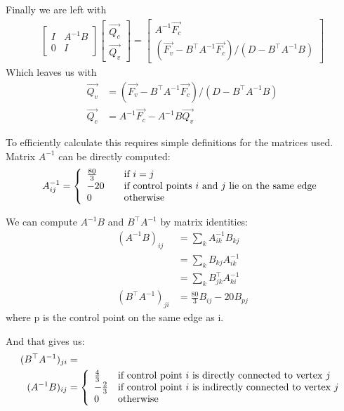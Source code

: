 \documentclass{article}
\begin{document}
Finally we are left with
\begin{align*}
\begin{bmatrix} 
I & A^{-1}B \\ 
0 & I
\end{bmatrix} 
\begin{bmatrix} 
\vec{Q_c} \\ 
\vec{Q_v}
\end{bmatrix}
=
\begin{bmatrix} 
A^{-1}\vec{F_c} \\ 
(\vec{F_v} - B^{\top}A^{-1}\vec{F_c})/(D - B^{\top}A^{-1}B)
\end{bmatrix}
\end{align*}
Which leaves us with
\begin{align*}
\vec{Q_v} &= (\vec{F_v} - B^{\top}A^{-1}\vec{F_c})/(D - B^{\top}A^{-1}B)\\
\vec{Q_c} &= A^{-1}\vec{F_c} - A^{-1}B \vec{Q_{v}}  
\end{align*}

To efficiently calculate this requires simple definitions for the matrices used.
Matrix $A^{-1}$ can be directly computed:
\begin{align*}
A^{-1}_{ij} = \left\{ 
  \begin{array}{l l}
    \frac{80}{3} & \quad \text{if $i=j$}\\
    -20 & \quad \text{if control points $i$ and $j$ lie on the same edge}\\
    0 & \quad \text{otherwise}\\
  \end{array} \right.
\end{align*}

We can compute $A^{-1}B$ and $B^{\top}A^{-1}$ by matrix identities:
\begin{align*}
(A^{-1}B)_{ij} &=  \sum_{k} A^{-1}_{ik} B_{kj} \\
&=  \sum_{k} B_{kj} A^{-1}_{ik} \\ 
&=  \sum_{k} B^{\top}_{jk} A^{-1}_{ki} \\ 
(B^{\top} A^{-1})_{ji} &=  \frac{80}{3} B_{ij} - 20 B_{pj}
\end{align*} 
where p is the control point on the same edge as i.

And that gives us:
\begin{align*}	
(B^{\top}A^{-1})_{ji} &=\\
(A^{-1}B)_{ij} &= \left\{ 
  \begin{array}{l l}
    \frac{4}{3} & \text{if control point $i$ is directly connected to vertex $j$}\\
    -\frac{2}{3} & \text{if control point $i$ is indirectly connected to vertex $j$}\\
    0 & \text{otherwise}\\
  \end{array} \right.  \\ 
\end{align*}
\end{document}
